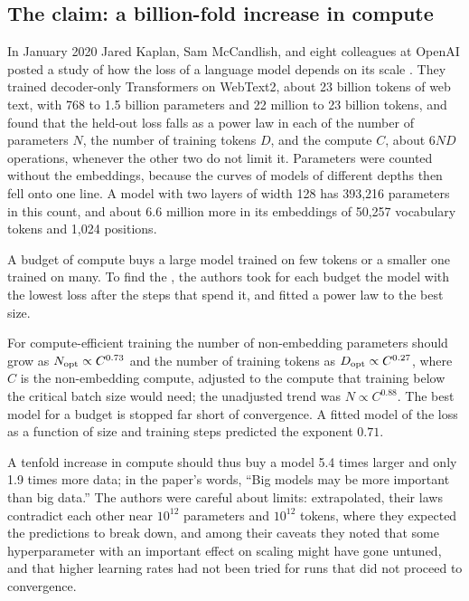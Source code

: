\begin{refsection}
\section{The claim: a billion-fold increase in compute}\label{sec:protocol:claim}

In January 2020 Jared Kaplan, Sam McCandlish, and eight colleagues at OpenAI posted a study of how the loss of a language model depends on its scale \parencite{KaplanEtAl2020}. They trained decoder-only Transformers on WebText2, about 23 billion tokens of web text, with 768 to 1.5 billion parameters and 22 million to 23 billion tokens, and found that the held-out loss falls as a power law in each of the number of parameters $N$, the number of training tokens $D$, and the compute $C$, about $6ND$ operations, whenever the other two do not limit it. Parameters were counted without the embeddings, because the curves of models of different depths then fell onto one line. A model with two layers of width 128 has 393,216 parameters in this count, and about 6.6 million more in its embeddings of 50,257 vocabulary tokens and 1,024 positions.

A budget of compute buys a large model trained on few tokens or a smaller one trained on many. To find the , the authors took for each budget the model with the lowest loss after the steps that spend it, and fitted a power law to the best size.

\begin{finding}\label{fd:protocol:kaplan}
For compute-efficient training the number of non-embedding parameters should grow as $N_{\mathrm{opt}}\propto C^{0.73}$ and the number of training tokens as $D_{\mathrm{opt}}\propto C^{0.27}$, where $C$ is the non-embedding compute, adjusted to the compute that training below the critical batch size would need; the unadjusted trend was $N\propto C^{0.88}$. The best model for a budget is stopped far short of convergence. A fitted model of the loss as a function of size and training steps predicted the exponent $0.71$.
\end{finding}

A tenfold increase in compute should thus buy a model 5.4 times larger and only 1.9 times more data; in the paper's words, \enquote{Big models may be more important than big data.} The authors were careful about limits: extrapolated, their laws contradict each other near $10^{12}$ parameters and $10^{12}$ tokens, where they expected the predictions to break down, and among their caveats they noted that some hyperparameter with an important effect on scaling might have gone untuned, and that higher learning rates had not been tried for runs that did not proceed to convergence.


\end{refsection}
